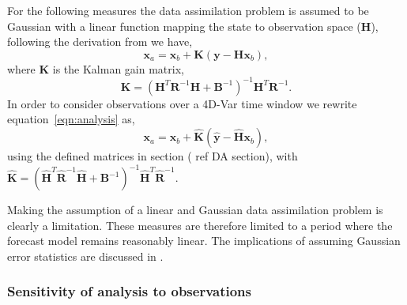 \documentclass[11pt]{article}
\begin{document}
For the following measures the data assimilation problem is assumed to be Gaussian with a linear function mapping the state to  observation space (\textbf{H}), following the derivation from \citet{kalnay2003atmospheric} we have,
\begin{equation}
\textbf{x}_{a} = \textbf{x}_{b} + \textbf{K}(\textbf{y} - \textbf{H}\textbf{x}_{b}), \label{eqn:analysis}
\end{equation}
where $\textbf{K}$ is the Kalman gain matrix,
\begin{equation}
\textbf{K} = (\textbf{H}^{T}\textbf{R}^{-1}\textbf{H} + \textbf{B}^{-1})^{-1}\textbf{H}^{T}\textbf{R}^{-1}.
\end{equation}
In order to consider observations over a 4D-Var time window we rewrite equation~\eqref{eqn:analysis} as,
\begin{equation}
\textbf{x}_{a} = \textbf{x}_{b} + \hat{\textbf{K}}(\hat{\textbf{y}} - \hat{\textbf{H}}\textbf{x}_{b}),
\end{equation}
using the defined matrices in section ({\color{red} ref DA section}), with $\hat{\textbf{K}} = (\hat{\textbf{H}}^{T}\hat{\textbf{R}}^{-1}\hat{\textbf{H}} + \textbf{B}^{-1})^{-1}\hat{\textbf{H}}^{T}\hat{\textbf{R}}^{-1}.$ 

Making the assumption of a linear and Gaussian data assimilation problem is clearly a limitation. These measures are therefore limited to a period where the forecast model remains reasonably linear. The implications of assuming Gaussian error statistics are discussed in \citet{Fowler2013}.



\subsubsection{Sensitivity of analysis to observations} \label{sec:inf_mat}
\end{document}
